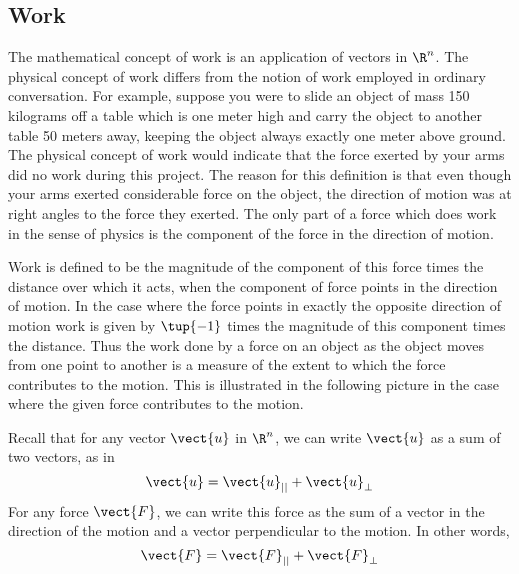 \subsection{Work}

The mathematical concept of work is an application of vectors in $\R^n$.  The physical concept
of work differs from the notion of work employed in
ordinary conversation. For example, suppose you were to slide an object of mass 150 kilograms
off a table which is one meter high and carry the object to another table 50 meters away, keeping the object always exactly one meter above ground. The physical concept
of work would indicate that the force exerted by your arms did no work
during this project. The reason for this definition is that even
though your arms exerted considerable force on the object, the direction of motion was at right angles to the force they
exerted. The only part of a force which does work in the sense of physics is
the component of the force in the direction of motion.

Work is defined to be the magnitude of the component of
this force times the distance over which it acts, when the 
component of force points in the direction of motion. In the case where the force points in exactly the opposite direction of motion
work is given by $\tup{-1} $
times the magnitude of this component times the distance.
Thus the work done by a force on an object as
the object moves from one point to another is a measure of the extent to
which the force contributes to the motion. This is illustrated in the
following picture in the case where the given force contributes to the
motion.

\begin{center}
\end{center}

Recall that for any vector $\vect{u}$ in $\R^n$, we can write $\vect{u}$ as a sum
of two vectors, as in
\begin{equation*}
\vect{u} = \vect{u}_{||} + \vect{u}_{\perp}
\end{equation*}
For any force $\vect{F}$,  
we can write this force as the sum of a vector in the direction of the motion and a vector
perpendicular to the motion. In other words,
\begin{equation*}
\vect{F} = \vect{F}_{||} + \vect{F}_{\bot}
\end{equation*}

